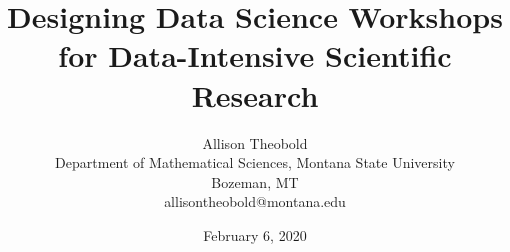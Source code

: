 \documentclass[12pt]{article}
\date{February 6, 2020}
\begin{document}
\def\spacingset#1{\renewcommand{\baselinestretch}%
{#1}\small\normalsize} \spacingset{1}

\title{\bf Designing Data Science Workshops for Data-Intensive Scientific Research}
  \author{Allison Theobold \\
    Department of Mathematical Sciences, Montana State University \\
    Bozeman, MT \\
    allisontheobold@montana.edu}

\maketitle 

\nocite{carpentries, asa, rmarkdown, tidyverse, tidyr, dplyr, ggplot, portal_data, ecology_curriculum, RStudioCloud, RStudio, carpentry, labs, nolan, hernandez, hampton, green, friedman, cobb, andelman}



\end{document}
